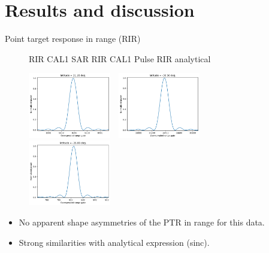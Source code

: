 \documentclass[compress,8pt]{beamer}
\begin{document}
\section{Results and discussion}
\begin{frame}{Point target response in range (RIR)}
 
 
 \begin{figure}[htb!]
  \hspace{0.5cm} RIR CAL1 SAR \hspace{1.8cm} RIR CAL1 Pulse\hspace{1.8cm} RIR analytical
   
   \medskip
   \centering
  \includegraphics[width=0.32\textwidth]{fig/PTR_cal1sar}$\quad$\includegraphics[width=0.32\textwidth]{fig/PTR_cal1pulse}$\quad$\includegraphics[width=0.32\textwidth]{fig/PTR_sinc}
\end{figure}

\begin{itemize}
 \item No apparent shape asymmetries of the PTR in range for this data.
  \item Strong similarities with analytical expression (sinc).
\end{itemize}


\end{frame}
\end{document}
